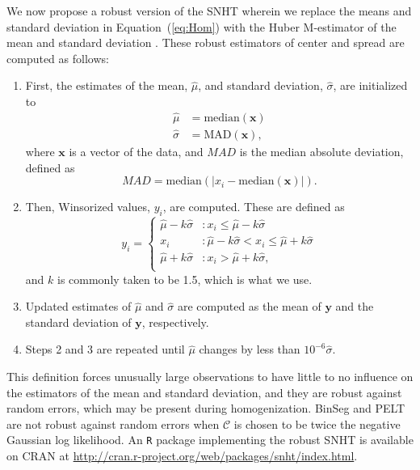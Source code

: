 \documentclass[12pt]{article}
\def\ni{\noindent}
\begin{document}
\begin{doublespacing}
We now propose a robust version of the SNHT wherein we replace the means and standard deviation in Equation~(\ref{eq:Hom}) with the Huber M-estimator of the mean and standard deviation \cite{huber11}.  These robust estimators of center and spread are computed as follows:
\begin{enumerate}
	\item First, the estimates of the mean, $\hat{\mu}$, and standard deviation, $\hat{\sigma}$, are initialized to
	\begin{align*}
		\hat{\mu} &= \mbox{median}(\mathbf{x})\\
		\hat{\sigma} &= \mbox{MAD}(\mathbf{x}),
	\end{align*}
	where $\mathbf{x}$ is a vector of the data, and $MAD$ is the median absolute deviation, defined as
	\begin{equation*}
		MAD = \mbox{median}( \lvert x_i - \mbox{median}(\mathbf{x}) \rvert ).
	\end{equation*}
	\item Then, Winsorized values, $y_i$, are computed.  These are defined as
	\begin{equation*}
		y_i = \left\{ \begin{array}{ll}
			\hat{\mu}-k \hat{\sigma} & : x_i \leq \hat{\mu}-k \hat{\sigma}\\
			x_i & : \hat{\mu}-k \hat{\sigma} < x_i \leq \hat{\mu}+k \hat{\sigma}\\
			\hat{\mu}+k \hat{\sigma} & : x_i > \hat{\mu}+k \hat{\sigma},\\
		\end{array} \right.
	\end{equation*}
	and $k$ is commonly taken to be 1.5, which is what we use.
	\item Updated estimates of $\hat{\mu}$ and $\hat{\sigma}$ are computed as the mean of $\mathbf{y}$ and the standard deviation of $\mathbf{y}$, respectively.
	\item Steps 2 and 3 are repeated until $\hat{\mu}$ changes by less than $10^{-6} \hat{\sigma}$.
\end{enumerate}

\ni This definition forces unusually large observations to have little to no influence on the estimators of the mean and standard deviation, and they are robust against random errors, which may be present during homogenization.  BinSeg and PELT are not robust against random errors when $\mathcal{C}$ is chosen to be twice the negative Gaussian log likelihood.  An \texttt{R} package implementing the robust SNHT is available on CRAN at \url{http://cran.r-project.org/web/packages/snht/index.html}.


\end{doublespacing}
\end{document}
